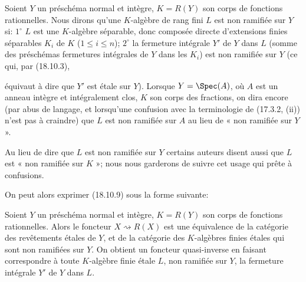 \begin{env}[18.10.10]
\label{IV.18.10.10}
Soient $Y$ un préschéma normal et intègre, $K=R(Y)$ son corps de fonctions rationnelles. Nous dirons qu'une $K$-algèbre de rang fini $L$ est non ramifiée sur $Y$ si: $1^\circ$ $L$ est une $K$-algèbre séparable, donc composée directe d'extensions finies séparables $K_i$ de $K$ ($1\leq i\leq n$); $2^\circ$ la fermeture intégrale $Y'$ de $Y$ dans $L$ (somme des préschémas fermetures intégrales de $Y$ dans les $K_i$) est non ramifiée sur $Y$ (ce qui, par (18.10.3),


équivaut à dire que $Y'$ est étale sur $Y$). Lorsque $Y=\Spec(A)$, où $A$ est un anneau intègre et intégralement clos, $K$ son corps des fractions, on dira encore (par abus de langage, et lorsqu'une confusion avec la terminologie de (17.3.2, (ii)) n'est pas à craindre) que $L$ est non ramifiée sur $A$ au lieu de « non ramifiée sur $Y$ ».
\end{env}

\begin{remark}[18.10.11]
Au lieu de dire que $L$ est non ramifiée sur $Y$ certains auteurs disent aussi que $L$ est « non ramifiée sur $K$ »; nous nous garderons de suivre cet usage qui prête à confusions.
\end{remark}

On peut alors exprimer (18.10.9) sous la forme suivante:

\begin{corollary}[18.10.12]
\label{IV.18.10.12}
Soient $Y$ un préschéma normal et intègre, $K=R(Y)$ son corps de fonctions rationnelles. Alors le foncteur $X\rightsquigarrow R(X)$ est une équivalence de la catégorie des revêtements étales de $Y$, et de la catégorie des $K$-algèbres finies étales qui sont non ramifiées sur $Y$. On obtient un foncteur quasi-inverse en faisant correspondre à toute $K$-algèbre finie étale $L$, non ramifiée sur $Y$, la fermeture intégrale $Y'$ de $Y$ dans $L$.
\end{corollary}

